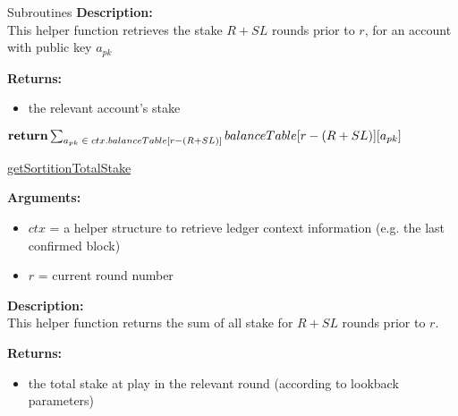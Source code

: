\documentclass[10pt,a4paper]{article}
\begin{document}
\begin{section}{Subroutines}
\noindent \textbf{Description:}\\
This helper function retrieves the stake $R + SL$ rounds prior to $r$, for an account
with public key $a_{pk}$

\noindent \textbf{Returns:}
\begin{itemize}
    \item the relevant account's stake
  \end{itemize}




\begin{algorithm}[H]\label{algo:get-sortition-W}
    \begin{algorithmic}[1]
        
        $\Return \sum_{a_{pk}\;\in\;ctx.balanceTable[r - (R + SL)]}{balanceTable[r - (R + SL)][a_{pk}]}$

        \EndFunction
    \end{algorithmic}
    \caption{\underline{getSortitionTotalStake}}
\end{algorithm}

\noindent \textbf{Arguments:}
\begin{itemize}
    \item $ctx$ = a helper structure to retrieve ledger context information (e.g. the last confirmed block)
    \item $r$ = current round number
  \end{itemize}


\noindent \textbf{Description:}\\
This helper function returns the sum of all stake for $R + SL$ rounds prior to $r$.

\noindent \textbf{Returns:}
\begin{itemize}
    \item the total stake at play in the relevant round (according to lookback parameters)
  \end{itemize}



\end{section}
\end{document}
